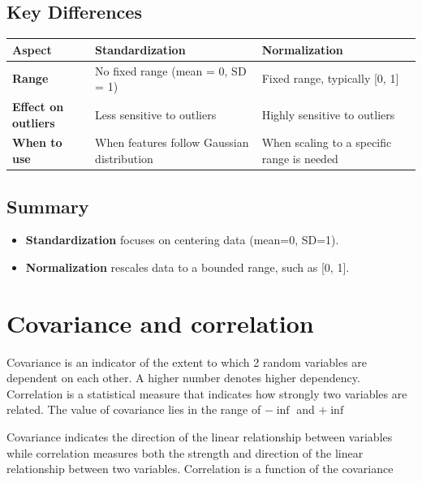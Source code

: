 \documentclass[12pt]{book}
\begin{document}
\subsection*{\textbf{Key Differences}}

\begin{tabular}{|p{3cm}|p{4cm}|p{5cm}|}
    \hline
    \textbf{Aspect}              & \textbf{Standardization}                   & \textbf{Normalization}   \\ \hline
    \textbf{Range}               & No fixed range (mean = 0, SD = 1)          & Fixed range, typically [0, 1]          \\ \hline
    \textbf{Effect on outliers}  & Less sensitive to outliers                 & Highly sensitive to outliers           \\ \hline
    \textbf{When to use}         & When features follow Gaussian distribution & When scaling to a specific range is needed \\ \hline
\end{tabular}



\subsection*{\textbf{Summary}}

\begin{itemize}
    \item [-] \textbf{Standardization} focuses on centering data (mean=0, SD=1).
    \item [-] \textbf{Normalization} rescales data to a bounded range, such as [0, 1].
\end{itemize}

\section{Covariance and
correlation}\label{covariance-and-correlation}

Covariance is an indicator of the extent to which 2 random variables are
dependent on each other. A higher number denotes higher dependency.
Correlation is a statistical measure that indicates how strongly two
variables are related. The value of covariance lies in the range of \(-\inf \)
and \(+\inf \)

Covariance indicates the direction of the linear relationship between
variables while correlation measures both the strength and direction of
the linear relationship between two variables. Correlation is a function
of the covariance
\end{document}
